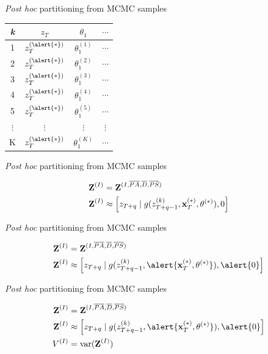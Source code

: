 \documentclass[12pt, compress, aspectratio=1610]{beamer}
\begin{document}
\begin{frame}{%
\protect\hypertarget{partitioning-from-mcmc-samples-2}{%
\emph{Post hoc} partitioning from MCMC samples}}

\begin{longtable}[]{@{}cccc@{}}
\toprule
\emph{k} & \(z_T\) & \(\theta_1\) & \(\cdots\)\tabularnewline
\midrule
\endhead
1 & \(z_{T}^{(\alert{\ast})}\) & \(\theta_1^{(1)}\) &
\(\cdots\)\tabularnewline
2 & \(z_{T}^{(\alert{\ast})}\) & \(\theta_1^{(2)}\) &
\(\cdots\)\tabularnewline
3 & \(z_{T}^{(\alert{\ast})}\) & \(\theta_1^{(3)}\) &
\(\cdots\)\tabularnewline
4 & \(z_{T}^{(\alert{\ast})}\) & \(\theta_1^{(4)}\) &
\(\cdots\)\tabularnewline
5 & \(z_{T}^{(\alert{\ast})}\) & \(\theta_1^{(5)}\) &
\(\cdots\)\tabularnewline
\(\vdots\) & \(\vdots\) & \(\vdots\) & \(\vdots\)\tabularnewline
K & \(z_{T}^{(\alert{\ast})}\) & \(\theta_1^{(K)}\) &
\(\cdots\)\tabularnewline
\bottomrule
\end{longtable}

\end{frame}

\begin{frame}{%
\protect\hypertarget{partitioning-from-mcmc-samples-3}{%
\emph{Post hoc} partitioning from MCMC samples}}

\begin{align*}
\textbf{Z}^{(I)} &= \textbf{Z}^{(I,\overline{PA},\overline{D},\overline{PS})} \\
\textbf{Z}^{(I)} &\approx \left[z_{T+q} \; | \; g(z_{T+q-1}^{(k)}, \textbf{x}^{(\ast)}_T, \boldmath{\theta}^{(\ast)}), 0 \right] \\
\end{align*}

\end{frame}

\begin{frame}{%
\protect\hypertarget{partitioning-from-mcmc-samples-4}{%
\emph{Post hoc} partitioning from MCMC samples}}

\begin{align*}
\textbf{Z}^{(I)} &= \textbf{Z}^{(I,\overline{PA},\overline{D},\overline{PS})} \\
\textbf{Z}^{(I)} &\approx \left[z_{T+q} \; | \; g(z_{T+q-1}^{(k)}, \alert{\textbf{x}^{(\ast)}_T, \boldmath{\theta}^{(\ast)}}), \alert{0} \right]
\end{align*}

\end{frame}

\begin{frame}{%
\protect\hypertarget{partitioning-from-mcmc-samples-5}{%
\emph{Post hoc} partitioning from MCMC samples}}

\begin{align*}
\textbf{Z}^{(I)} &= \textbf{Z}^{(I,\overline{PA},\overline{D},\overline{PS})} \\
\textbf{Z}^{(I)} &\approx \left[z_{T+q} \; | \; g(z_{T+q-1}^{(k)}, \alert{\textbf{x}^{(\ast)}_T, \boldmath{\theta}^{(\ast)}}), \alert{0} \right] \\
V^{(I)} &= \text{var}(\textbf{Z}^{(I)})
\end{align*}

\end{frame}
\end{document}
